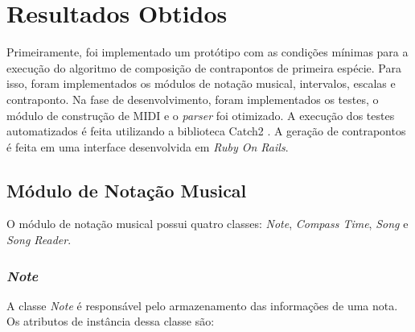 \chapter[Resultados Obtidos]{Resultados Obtidos} \label{c3}

  Primeiramente, foi implementado um protótipo com as condições mínimas para a execução do algoritmo de composição de contrapontos de primeira espécie. Para isso, foram implementados os módulos de notação musical, intervalos, escalas e contraponto. Na fase de desenvolvimento, foram implementados os testes, o módulo de construção de MIDI e o \textit{parser} foi otimizado. A execução dos testes automatizados é feita utilizando a biblioteca Catch2 \footnotemark {}. A geração de contrapontos é feita em uma interface desenvolvida em \textit{Ruby On Rails}.

  \section[Módulo de Notação Musical]{Módulo de Notação Musical}

    O módulo de notação musical possui quatro classes: \textit{Note}, \textit{Compass Time}, \textit{Song} e \textit{Song Reader}.

    \subsection[\textit{Note}]{\textit{Note}}

      A classe \textit{Note} é responsável pelo armazenamento das informações de uma nota. Os atributos de instância dessa classe são:

